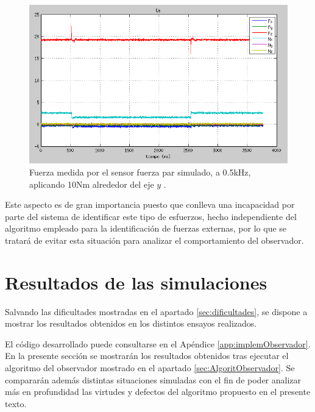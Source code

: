 \begin{itemize}
\begin{figure}[h!]
\centering
\includegraphics[scale=0.6]{Figuras/FTerror8}
\caption{Fuerza medida por el sensor fuerza par simulado, a 0.5kHz, aplicando 10Nm alrededor del eje $y$ .}
\label{fig:errorFTsensor8}
\end{figure}

Este aspecto es de gran importancia puesto que conlleva una incapacidad por parte del sistema de identificar este tipo de esfuerzos, hecho independiente del algoritmo empleado para la identificación de fuerzas externas, por lo que se tratará de evitar esta situación para analizar el comportamiento del observador. \par 

\end{itemize}

\section{Resultados de las simulaciones}

Salvando las dificultades mostradas en el apartado \ref{sec:dificultades}, se dispone a mostrar los resultados obtenidos en los distintos ensayos realizados. \par 

El código desarrollado puede consultarse en el Apéndice \ref{app:implemObservador}. En la presente sección se mostrarán los resultados obtenidos tras ejecutar el algoritmo del observador mostrado en el apartado \ref{sec:AlgoritObservador}. Se compararán además distintas situaciones simuladas con el fin de poder analizar más en profundidad las virtudes y defectos del algoritmo propuesto en el presente texto. \par 

